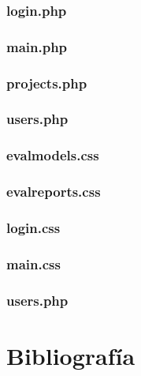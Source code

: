 \documentclass[12pt,a4paper,spanish,twoside]{article}
\begin{document}
\subsubsection{login.php}

\subsubsection{main.php}

\subsubsection{projects.php}

\subsubsection{users.php}


\subsubsection{evalmodels.css}

\subsubsection{evalreports.css}

\subsubsection{login.css}

\subsubsection{main.css}

\subsubsection{users.php}


\section{Bibliografía}
\end{document}
